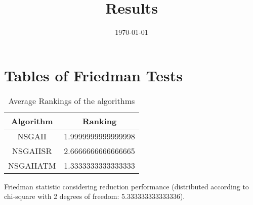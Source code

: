 \documentclass{article}
\title{Results}
\author{}
\date{\today}
\begin{document}
\oddsidemargin 0in \topmargin 0in\maketitle
\section{Tables of Friedman Tests}
\begin{table}[!htp]
\centering
\caption{Average Rankings of the algorithms
}\begin{tabular}{c|c}
Algorithm&Ranking\\
\hline
NSGAII&1.9999999999999998\\
NSGAIISR&2.6666666666666665\\
NSGAIIATM&1.3333333333333333\\
\end{tabular}
\end{table}


Friedman statistic considering reduction performance (distributed according to chi-square with 2 degrees of freedom: 5.333333333333336).
\end{document}
